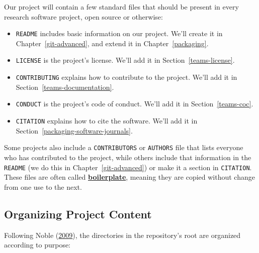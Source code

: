 \documentclass[
]{krantz}
\newcommand{\gref}[2]{\hyperlink{#2}{\textbf{#1}}}
\begin{document}
Our project will contain a few standard files
that should be present in every research software project,
open source or otherwise:

\begin{itemize}
\item
  \texttt{README} includes basic information on our project.
  We'll create it in Chapter~\ref{git-advanced},
  and extend it in Chapter~\ref{packaging}.
\item
  \texttt{LICENSE} is the project's license. We'll add it in Section~\ref{teams-license}.
\item
  \texttt{CONTRIBUTING} explains how to contribute to the project. We'll add it in Section~\ref{teams-documentation}.
\item
  \texttt{CONDUCT} is the project's code of conduct. We'll add it in Section~\ref{teams-coc}.
\item
  \texttt{CITATION} explains how to cite the software. We'll add it in Section~\ref{packaging-software-journals}.
\end{itemize}

Some projects also include a \texttt{CONTRIBUTORS} or \texttt{AUTHORS} file that
lists everyone who has contributed to the project,
while others include that information in the \texttt{README} (we do this in Chapter~\ref{git-advanced})
or make it a section in \texttt{CITATION}.
These files are often called \gref{boilerplate}{boilerplate},
meaning they are copied without change from one use to the next.

\hypertarget{intro-organize}{%
\subsection{Organizing Project Content}\label{intro-organize}}

Following Noble (\protect\hyperlink{ref-Nobl2009}{2009}),
the directories in the repository's root are organized according to purpose:
\end{document}
